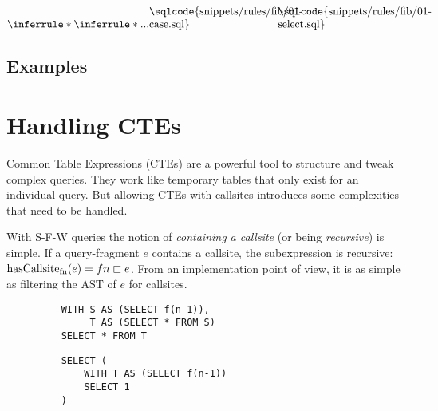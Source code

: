 

$
\inferrule*{
    \inferrule*{...}{
{\begin{minipage}[b]{12em}
\sqlcode{snippets/rules/fib/01-case.sql}
\end{minipage}}
    }
}{
{\begin{minipage}[b]{12em}
\sqlcode{snippets/rules/fib/01-select.sql}
\end{minipage}}
}
$

\fi

\subsection{Examples}


\section{Handling CTEs}

Common Table Expressions (CTEs) are a powerful tool to structure and tweak complex queries. They work like temporary tables that only exist for an individual query. But allowing CTEs with callsites introduces some complexities that need to be handled.

With S-F-W queries the notion of \textit{containing a callsite} (or being \textit{recursive}) is simple. If a query-fragment $e$ contains a callsite, the subexpression is recursive: $\operatorname{\text{hasCallsite}_{fn}}(e) = fn \sqsubset e$. From an implementation point of view, it is as simple as filtering the AST of $e$ for callsites.

\begin{wrapfigure}{r}{.5\textwidth}\vspace{-5mm} 
    \begin{minipage}{\linewidth}
    \label{fig:simple_indiref}\par\vfill
    \begin{verbatim}
    WITH S AS (SELECT f(n-1)),
         T AS (SELECT * FROM S)
    SELECT * FROM T
    \end{verbatim}
    \label{fig:indirect_callsite}\par
    \vspace{3mm}
    \begin{verbatim}
    SELECT (
        WITH T AS (SELECT f(n-1))
        SELECT 1
    )
    \end{verbatim}
    \label{fig:unused_callsite}
\end{minipage}
\caption{}
\label{lst:indirect_callsite_ref}\vspace{-5mm} 
\end{wrapfigure}

